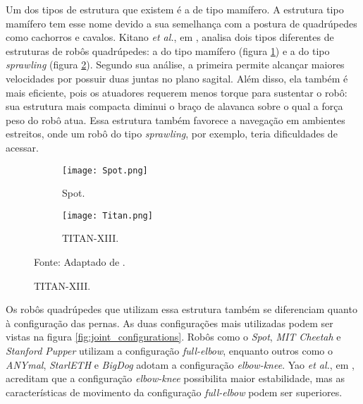 \documentclass[../main.tex]{subfiles}
\begin{document}
Um dos tipos de estrutura que existem é a de tipo mamífero. A estrutura tipo mamífero tem esse nome devido a sua semelhança com a postura de quadrúpedes como cachorros e cavalos. Kitano \textit{et al.}, em \cite{Kitano2016}, analisa dois tipos diferentes de estruturas de robôs quadrúpedes: a do tipo mamífero (figura \ref{fig:robots_structures_b}) e a do tipo \textit{sprawling} (figura \ref{fig:robots_structures_c}). Segundo sua análise, a primeira permite alcançar maiores velocidades por possuir duas juntas no plano sagital. Além disso, ela também é mais eficiente, pois os atuadores requerem menos torque para sustentar o robô: sua estrutura mais compacta diminui o braço de alavanca sobre o qual a força peso do robô atua. Essa estrutura também favorece a navegação em ambientes estreitos, onde um robô do tipo \textit{sprawling}, por exemplo, teria dificuldades de acessar.

\begin{figure}[h]
  \centering
  \caption{Exemplos de robôs com estruturas do tipo mamífero e \textit{sprawling}.}
  \begin{subfigure}[t]{0.23\textwidth}
    \centering
    \texttt{[image: Spot.png]}
    \caption{Spot.}
    \label{fig:robots_structures_b}
  \end{subfigure}
  \begin{subfigure}[t]{0.23\textwidth}
    \centering
    \texttt{[image: Titan.png]}
    \caption{TITAN-XIII.}
    \label{fig:robots_structures_c}
  \end{subfigure}
  \vfill
  Fonte: Adaptado de  \cite{Kitano2016} \cite{SpotImg1}.
  \label{fig:robots_structures}
\end{figure}

Os robôs quadrúpedes que utilizam essa estrutura também se diferenciam quanto à configuração das pernas. As duas configurações mais utilizadas podem ser vistas na figura \ref{fig:joint_configurations}. Robôs como o \textit{Spot}, \textit{MIT Cheetah} e \textit{Stanford Pupper} utilizam a configuração \textit{full-elbow}, enquanto outros como o \textit{ANYmal}, \textit{StarlETH} e \textit{BigDog} adotam a configuração \textit{elbow-knee}. Yao \textit{et al.}, em \cite{Yao2021}, acreditam que a configuração \textit{elbow-knee} possibilita maior estabilidade, mas as características de movimento da configuração \textit{full-elbow} podem ser superiores.
\end{document}
